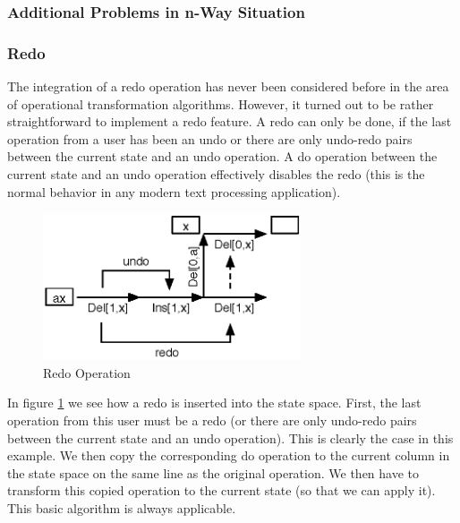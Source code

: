 \subsubsection{Additional Problems in n-Way Situation}


\subsubsection{Redo}
The integration of a redo operation has never been considered before in the area of operational transformation algorithms. However, it turned out to be rather straightforward to implement a redo feature. A redo can only be done, if the last operation from a user has been an undo or there are only undo-redo pairs between the current state and an undo operation. A do operation between the current state and an undo operation effectively disables the redo (this is the normal behavior in any modern text processing application).

\begin{figure}[htb]
 \centering
 \includegraphics[width=7.62cm,height=4.34cm]{../../images/concepts_redo.eps}
 \caption{Redo Operation}
 \label{fig:concepts.redo}
\end{figure}

In figure \ref{fig:concepts.redo} we see how a redo is inserted into the state space. First, the last operation from this user must be a redo (or there are only undo-redo pairs between the current state and an undo operation). This is clearly the case in this example. We then copy the corresponding do operation to the current column in the state space on the same line as the original operation. We then have to transform this copied operation to the current state (so that we can apply it). This basic algorithm is always applicable.
